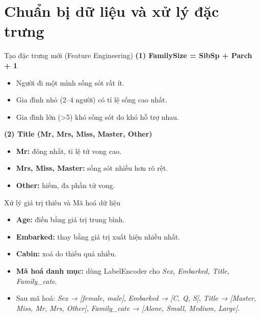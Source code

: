 \documentclass[
	11pt
]{beamer}
\begin{document}
\section{Chuẩn bị dữ liệu và xử lý đặc trưng}
\begin{frame}{Tạo đặc trưng mới (Feature Engineering)}
	\small
	\textbf{(1) FamilySize = SibSp + Parch + 1}
	\begin{itemize}
		\item Người đi một mình sống sót rất ít.  
		\item Gia đình nhỏ (2–4 người) có tỉ lệ sống cao nhất.  
		\item Gia đình lớn (>5) khó sống sót do khó hỗ trợ nhau.  
	\end{itemize}
	
	\vspace{0.4em}
	\textbf{(2) Title (Mr, Mrs, Miss, Master, Other)}
	\begin{itemize}
		\item \textbf{Mr:} đông nhất, tỉ lệ tử vong cao.  
		\item \textbf{Mrs, Miss, Master:} sống sót nhiều hơn rõ rệt.  
		\item \textbf{Other:} hiếm, đa phần tử vong.  
	\end{itemize}
\end{frame}

\begin{frame}{Xử lý giá trị thiếu và Mã hoá dữ liệu}
	\small
	\begin{itemize}
		\item \textbf{Age:} điền bằng giá trị trung bình.  
		\item \textbf{Embarked:} thay bằng giá trị xuất hiện nhiều nhất.  
		\item \textbf{Cabin:} xoá do thiếu quá nhiều.  
		\item \textbf{Mã hoá danh mục:} dùng LabelEncoder cho \textit{Sex, Embarked, Title, Family\_cate}.  
		\item Sau mã hoá:  
		\textit{Sex → [female, male]}, \textit{Embarked → [C, Q, S]},  
		\textit{Title → [Master, Miss, Mr, Mrs, Other]},  
		\textit{Family\_cate → [Alone, Small, Medium, Large]}.  
	\end{itemize}
\end{frame}
\end{document}
